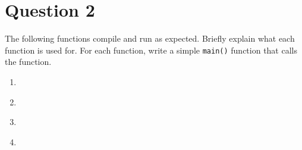 
\section*{Question 2}

The following functions compile and run as expected.
Briefly explain what each function is used for.
For each function, write a simple \texttt{main()} function that calls the function.

\lstset{language=c,tabsize=4}
\begin{enumerate}[label=(\alph*)]
\item \lstinline{}

\item \lstinline{}

\newpage
\item \lstinline{}

\item \lstinline{}

\end{enumerate}
